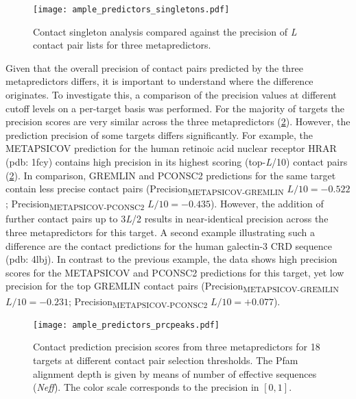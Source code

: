 \begin{figure}[H]
    \centering
    \texttt{[image: ample\_predictors\_singletons.pdf]}
    \caption[Contact singleton analysis for three metapredictors]{Contact singleton analysis compared against the precision of \textit{L} contact pair lists for three metapredictors.}
    \label{fig:ample_predictors_singletons}
\end{figure}

Given that the overall precision of contact pairs predicted by the three metapredictors differs, it is important to understand where the difference originates. To investigate this, a comparison of the precision values at different cutoff levels on a per-target basis was performed. For the majority of targets the precision scores are very similar across the three metapredictors (\cref{fig:ample_predictors_prcpeaks}). However, the prediction precision of some targets differs significantly. For example, the METAPSICOV prediction for the human retinoic acid nuclear receptor HRAR (\gls{pdb}: 1fcy) contains high precision in its highest scoring (top-\textit{L}/10) contact pairs (\cref{fig:ample_predictors_prcpeaks}). In comparison, GREMLIN and PCONSC2 predictions for the same target contain less precise contact pairs (\textDelta Precision\textsubscript{METAPSICOV-GREMLIN} $L/10=-0.522$; \textDelta Precision\textsubscript{METAPSICOV-PCONSC2} $L/10=-0.435$). However, the addition of further contact pairs up to 3\textit{L}/2 results in near-identical precision across the three metapredictors for this target. A second example illustrating such a difference are the contact predictions for the human galectin-3 CRD sequence (\gls{pdb}: 4lbj). In contrast to the previous example, the data shows high precision scores for the METAPSICOV and PCONSC2 predictions for this target, yet low precision for the top GREMLIN contact pairs (\textDelta Precision\textsubscript{METAPSICOV-GREMLIN} $L/10=-0.231$; \textDelta Precision\textsubscript{METAPSICOV-PCONSC2} $L/10=+0.077$). 

\begin{figure}[H]
    \centering
    \texttt{[image: ample\_predictors\_prcpeaks.pdf]}
    \caption[Comparison of contact precision for three metapredictors]{Contact prediction precision scores from three metapredictors for 18 targets at different contact pair selection thresholds. The Pfam alignment depth is given by means of number of effective sequences (\textit{Neff}). The color scale corresponds to the precision in $[0, 1]$.}
    \label{fig:ample_predictors_prcpeaks}
\end{figure}

